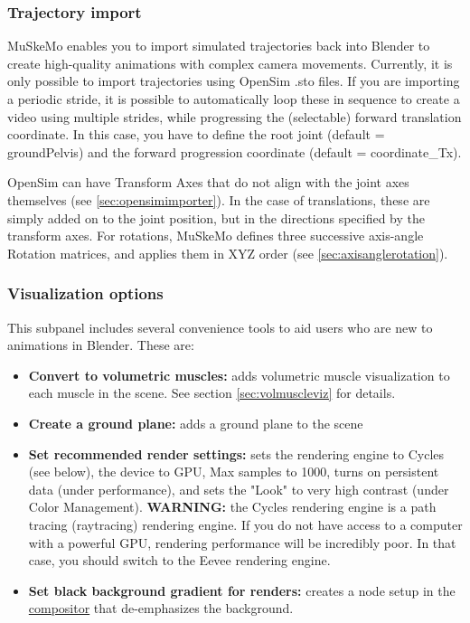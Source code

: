 \documentclass{article}
\begin{document}
\subsubsection{Trajectory import}
\label{sec:trajectoryimport}
MuSkeMo enables you to import simulated trajectories back into Blender to create high-quality animations with complex camera movements. Currently, it is only possible to import trajectories using OpenSim .sto files. If you are importing a periodic stride, it is possible to automatically loop these in sequence to create a video using multiple strides, while progressing the (selectable) forward translation coordinate. In this case, you have to define the root joint (default =  groundPelvis) and the forward progression coordinate (default = coordinate\_Tx).

OpenSim can have Transform Axes that do not align with the joint axes themselves (see \ref{sec:opensimimporter}). In the case of translations, these are simply added on to the joint position, but in the directions specified by the transform axes. For rotations, MuSkeMo defines three successive axis-angle Rotation matrices, and applies them in XYZ order (see \ref{sec:axisanglerotation}).

\subsubsection{Visualization options}

This subpanel includes several convenience tools to aid users who are new to animations in Blender. These are:

\begin{itemize}
    \item \textbf{Convert to volumetric muscles:} adds volumetric muscle visualization to each muscle in the scene. See section \ref{sec:volmuscleviz} for details.
    \item \textbf{Create a ground plane:} adds a ground plane to the scene
    \item \textbf{Set recommended render settings:} sets the rendering engine to Cycles (see below), the device to GPU, Max samples to 1000, turns on persistent data (under performance), and sets the "Look" to very high contrast (under Color Management). \textbf{WARNING:} the Cycles rendering engine is a path tracing (raytracing) rendering engine. If you do not have access to a computer with a powerful GPU, rendering performance will be incredibly poor. In that case, you should switch to the Eevee rendering engine.
    \item \textbf{Set black background gradient for renders:} creates a node setup in the \href{https://docs.blender.org/manual/en/latest/compositing/index.html}{compositor} that de-emphasizes the background.
\end{itemize}
\end{document}
